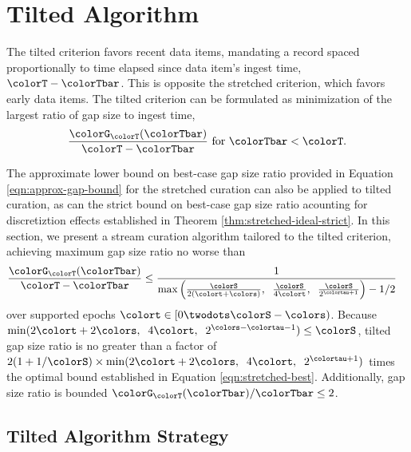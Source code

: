 \section{Tilted Algorithm} \label{sec:tilted}

The tilted criterion favors recent data items, mandating a record spaced proportionally to time elapsed since data item's ingest time, $\colorT - \colorTbar$.
This is opposite the stretched criterion, which favors early data items.
The tilted criterion can be formulated as minimization of the largest ratio of gap size to ingest time,
\begin{align*}
\frac{\colorG_{\colorT}(\colorTbar)}{\colorT - \colorTbar} \text{ for } \colorTbar < \colorT.
\end{align*}

The approximate lower bound on best-case gap size ratio provided in Equation \ref{eqn:approx-gap-bound} for the stretched curation can also be applied to tilted curation, as can the strict bound on best-case gap size ratio acounting for discretiztion effects established in Theorem \ref{thm:stretched-ideal-strict}.
In this section, we present a stream curation algorithm tailored to the tilted criterion, achieving maximum gap size ratio no worse than
\begin{align}
  \frac{\colorG_{\colorT}(\colorTbar)}{\colorT - \colorTbar}
  &\leq
  \frac{
    1
  }{
    \max\Big(
      \frac{\colorS}{2(\colort + \colors)},\;\;
      \frac{\colorS}{4\colort},\;\;
      \frac{\colorS}{2^{\colortau + 1}}
    \Big)
    - 1/2
  }
  \label{eqn:tilted-gap-size-bound}
\end{align}
over supported epochs $\colort \in [0\twodots\colorS - \colors)$.
Because $\min(2\colort + 2\colors,\;\; 4\colort,\;\; 2^{\colors - \colortau - 1}) \leq \colorS$, tilted gap size ratio is no greater than a factor of $2(1 + 1/\colorS)\times\min(2\colort + 2\colors, \;\; 4\colort, \;\; 2^{\colortau + 1})$ times the optimal bound established in Equation \ref{eqn:stretched-best}.
Additionally, gap size ratio is bounded ${\colorG_{\colorT}(\colorTbar)}/{\colorTbar} \leq 2$.


\subsection{Tilted Algorithm Strategy}
\label{sec:tilted-strategy}



